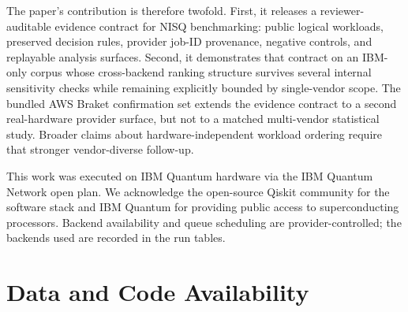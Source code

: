\documentclass[aps,prxquantum,twocolumn,superscriptaddress,amsmath,amssymb,longbibliography,floatfix]{revtex4-2}
\begin{document}
The paper's contribution is therefore twofold. First, it releases a reviewer-auditable evidence contract for NISQ benchmarking: public logical workloads, preserved decision rules, provider job-ID provenance, negative controls, and replayable analysis surfaces. Second, it demonstrates that contract on an IBM-only corpus whose cross-backend ranking structure survives several internal sensitivity checks while remaining explicitly bounded by single-vendor scope. The bundled AWS Braket confirmation set extends the evidence contract to a second real-hardware provider surface, but not to a matched multi-vendor statistical study. Broader claims about hardware-independent workload ordering require that stronger vendor-diverse follow-up.

\begin{acknowledgments}
This work was executed on IBM Quantum hardware via the IBM Quantum Network open plan. We acknowledge the open-source Qiskit community for the software stack and IBM Quantum for providing public access to superconducting processors. Backend availability and queue scheduling are provider-controlled; the backends used are recorded in the run tables.
\end{acknowledgments}

\section*{Data and Code Availability}
\end{document}
